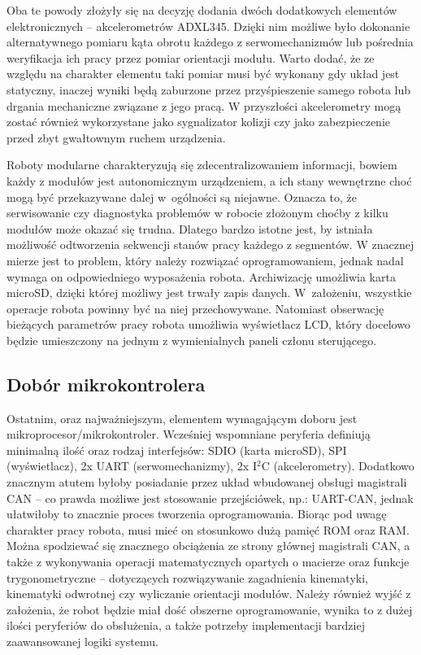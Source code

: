Oba te powody złożyły się na decyzję dodania dwóch dodatkowych elementów elektronicznych -- akcelerometrów ADXL345. Dzięki nim możliwe było dokonanie alternatywnego pomiaru kąta obrotu każdego z serwomechanizmów lub pośrednia weryfikacja ich pracy przez pomiar orientacji modułu. Warto dodać, że ze względu na charakter elementu taki pomiar musi być wykonany gdy układ jest statyczny, inaczej wyniki będą zaburzone przez przyśpieszenie samego robota lub drgania mechaniczne związane z jego pracą. W przyszłości akcelerometry mogą zostać również wykorzystane jako sygnalizator kolizji czy jako zabezpieczenie przed zbyt gwałtownym ruchem urządzenia.

Roboty modularne charakteryzują się zdecentralizowaniem informacji, bowiem każdy z modułów jest autonomicznym urządzeniem, a ich stany wewnętrzne choć mogą być przekazywane dalej w~ogólności są niejawne. Oznacza to, że serwisowanie czy diagnostyka problemów w robocie złożonym choćby z kilku modułów może okazać się trudna. Dlatego bardzo istotne jest, by istniała możliwość odtworzenia sekwencji stanów pracy każdego z segmentów. W znacznej mierze jest to problem, który należy rozwiązać oprogramowaniem, jednak nadal wymaga on odpowiedniego wyposażenia robota. Archiwizację umożliwia karta microSD, dzięki której możliwy jest trwały zapis danych. W~założeniu, wszystkie operacje robota powinny być na niej przechowywane. Natomiast obserwację bieżących parametrów pracy robota umożliwia wyświetlacz LCD, który docelowo będzie umieszczony na jednym z wymienialnych paneli członu sterującego. 

\subsection{Dobór mikrokontrolera}
Ostatnim, oraz najważniejszym, elementem wymagającym doboru jest mikroprocesor/mikrokontroler. Wcześniej wspomniane peryferia definiują minimalną ilość oraz rodzaj interfejsów: SDIO (karta microSD), SPI (wyświetlacz), 2x UART (serwomechanizmy), 2x I$^2$C (akcelerometry). Dodatkowo znacznym atutem byłoby posiadanie przez układ wbudowanej obsługi magistrali CAN -- co prawda możliwe jest stosowanie przejściówek, np.: UART-CAN, jednak ułatwiłoby to znacznie proces tworzenia oprogramowania. Biorąc pod uwagę charakter pracy robota, musi mieć on stosunkowo dużą pamięć ROM oraz RAM. Można spodziewać się znacznego obciążenia ze strony głównej magistrali CAN, a także z wykonywania operacji matematycznych opartych o macierze oraz funkcje trygonometryczne -- dotyczących rozwiązywanie zagadnienia kinematyki, kinematyki odwrotnej czy wyliczanie orientacji modułów. Należy również wyjść z założenia, że robot będzie miał dość obszerne oprogramowanie, wynika to z dużej ilości peryferiów do obsłużenia, a także potrzeby implementacji bardziej zaawansowanej logiki systemu.

